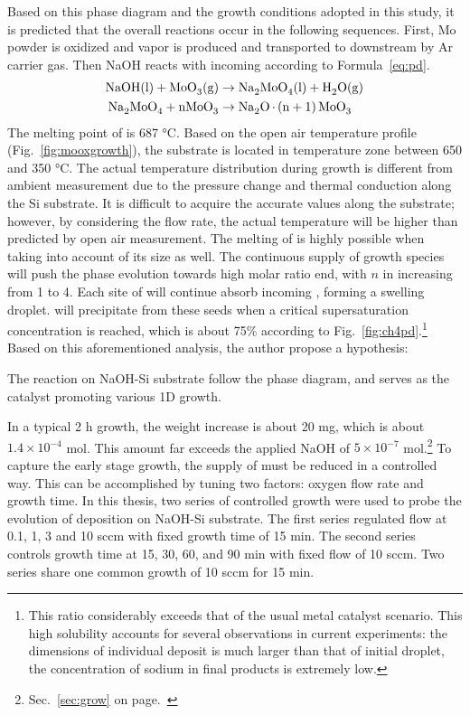 Based on this phase diagram and the growth conditions adopted in this study, it is predicted that the overall reactions occur in the following sequences. First, Mo powder is oxidized and  vapor is produced and transported to downstream by Ar carrier gas. Then NaOH reacts with incoming  according to Formula~\ref{eq:pd}. 
\begin{subequations}\label{eq:pd}
\begin{align}
\cee{NaOH(l) + MoO3(g) &\rightarrow Na2MoO4(l) + H2O(g)\\
Na2MoO4 + nMoO3   &\rightarrow Na2O.(n + 1)MoO3}
\end{align}
\end{subequations}
The melting point of  is 687 \si{\degreeCelsius}. Based on the open air temperature profile (Fig.~\ref{fig:mooxgrowth}), the substrate is located in temperature zone between 650 and 350 \si{\degreeCelsius}. The actual temperature distribution during growth is different from ambient measurement due to the pressure change and thermal conduction along the Si substrate. It is difficult to acquire the accurate values along the substrate; however, by considering the flow rate, the actual temperature will be higher than predicted by open air measurement.\cite{Subannajui2010} The melting of  is highly possible when taking into account of its size as well.\cite{Bruggemann1997} The continuous supply of  growth species will push the phase evolution towards high  molar ratio end, with $n$ in  increasing from 1 to 4. Each site of  will continue absorb incoming , forming a swelling droplet.  will precipitate from these seeds when a critical supersaturation concentration is reached, which is about 75\% according to Fig.~\ref{fig:ch4pd}.\footnote{This ratio considerably exceeds that of the usual metal catalyst scenario. This high solubility accounts for several observations in current experiments: the dimensions of individual deposit is much larger than that of initial droplet, the concentration of sodium in final products is extremely low.}    Based on this aforementioned analysis, the author propose a hypothesis:


The reaction on NaOH-Si substrate follow the phase diagram, and  serves as the catalyst promoting various 1D  growth.


In a typical 2 h growth, the  weight increase is about 20 mg, which is about $1.4\times 10^{-4}$ mol. This amount far exceeds the applied NaOH of $5\times 10^{-7}$ mol.\footnote{Sec.~\ref{sec:grow} on page.~\pageref{sec:grow}} To capture the early stage growth, the supply of  must be reduced in a controlled way. This can be accomplished by tuning two factors: oxygen flow rate and growth time. In this thesis, two series of controlled growth were used to probe the evolution of  deposition on NaOH-Si substrate. The first series regulated  flow at 0.1, 1, 3 and 10 sccm with fixed growth time of 15 min. The second series controls growth time at 15, 30, 60, and 90 min with fixed  flow of 10 sccm. Two series share one common growth of 10 sccm  for 15 min. 


